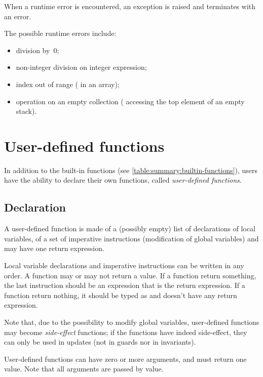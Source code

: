When a runtime error is encountered, an exception is raised and \imitator{} terminates with an error.

The possible runtime errors include:
\begin{itemize}
	\item division by~0;
	\item non-integer division on integer expression;
	\item index out of range (\eg{} in an array);
	\item operation on an empty collection (\eg{} accessing the top element of an empty stack).
\end{itemize}


\section{User-defined functions}\label{section:user_defined_functions}

In addition to the built-in functions (see \cref{table:summary:builtin-functions}), users have the ability to declare their own functions, called \emph{user-defined functions}.

\subsection{Declaration}

A user-defined function is made of a (possibly empty) list of declarations of local variables, of a set of imperative instructions (modification of global variables) and may have one return expression.

Local variable declarations and imperative instructions can be written in any order. A function may or may not return a value.
If a function return something, the last instruction should be an expression that is the return expression. If a function return nothing, it should be typed as  and doesn't have any return expression.

Note that, due to the possibility to modify global variables, user-defined functions may become \emph{side-effect} functions; if the functions have indeed side-effect, they can only be used in updates (not in guards nor in invariants).

User-defined functions can have zero or more arguments, and must return one value. Note that all arguments are passed by value.

